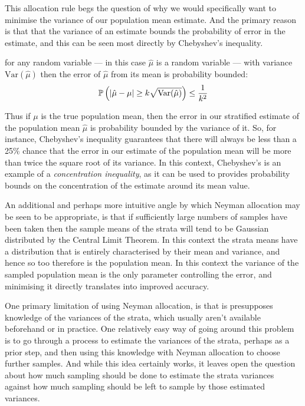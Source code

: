 This allocation rule begs the question of why we would specifically want to minimise the variance of our population mean estimate.
And the primary reason is that that the variance of an estimate bounds the probability of error in the estimate, and this can be seen most directly by Chebyshev's inequality.

\begin{theorem}\label{thm:chebyshevs}
for any random variable --- in this case $\hat{\mu}$ is a random variable --- with variance $\text{Var}(\hat{\mu})$ then the error of $\hat{\mu}$ from its mean is probability bounded:
$$ \operatorname{\mathbb{P}}\left(|\hat{\mu}-\mu|\ge k\sqrt{\text{Var}(\hat{\mu})}\right)\le\frac{1}{k^2} $$
\end{theorem}

Thus if $\mu$ is the true population mean, then the error in our stratified estimate of the population mean $\hat{\mu}$ is probability bounded by the variance of it.
So, for instance, Chebyshev's inequality guarantees that there will always be less than a 25\% chance that the error in our estimate of the population mean will be more than twice the square root of its variance.
In this context, Chebyshev's is an example of a \textit{concentration inequality}, as it can be used to provides probability bounds on the concentration of the estimate around its mean value.

An additional and perhaps more intuitive angle by which Neyman allocation may be seen to be appropriate, is that if sufficiently large numbers of samples have been taken then the sample means of the strata will tend to be Gaussian distributed by the Central Limit Theorem.
In this context the strata means have a distribution that is entirely characterised by their mean and variance, and hence so too therefore is the population mean.
In this context the variance of the sampled population mean is the only parameter controlling the error, and minimising it directly translates into improved accuracy.

One primary limitation of using Neyman allocation, is that is presupposes knowledge of the variances of the strata, which usually aren't available beforehand or in practice.
One relatively easy way of going around this problem is to go through a process to estimate the variances of the strata, perhaps as a prior step, and then using this knowledge with Neyman allocation to choose further samples.
And while this idea certainly works, it leaves open the question about how much sampling should be done to estimate the strata variances against how much sampling should be left to sample by those estimated variances.

